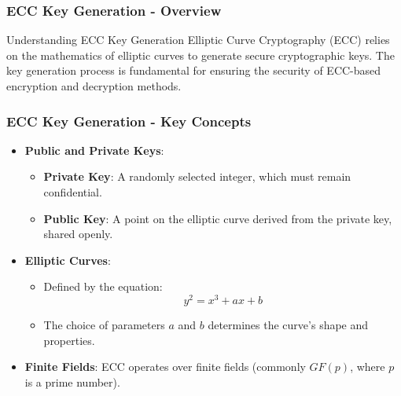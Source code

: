 \documentclass{beamer}
\begin{document}
\begin{frame}[fragile]
    \frametitle{ECC Key Generation - Overview}
    \begin{block}{Understanding ECC Key Generation}
        Elliptic Curve Cryptography (ECC) relies on the mathematics of elliptic curves to generate secure cryptographic keys. The key generation process is fundamental for ensuring the security of ECC-based encryption and decryption methods.
    \end{block}
\end{frame}

\begin{frame}[fragile]
    \frametitle{ECC Key Generation - Key Concepts}
    \begin{itemize}
        \item \textbf{Public and Private Keys}:
        \begin{itemize}
            \item \textbf{Private Key}: A randomly selected integer, which must remain confidential.
            \item \textbf{Public Key}: A point on the elliptic curve derived from the private key, shared openly.
        \end{itemize}
        
        \item \textbf{Elliptic Curves}:
        \begin{itemize}
            \item Defined by the equation:
            \begin{equation}
                y^2 = x^3 + ax + b
            \end{equation}
            \item The choice of parameters \(a\) and \(b\) determines the curve's shape and properties.
        \end{itemize}
        
        \item \textbf{Finite Fields}: ECC operates over finite fields (commonly \(GF(p)\), where \(p\) is a prime number).
    \end{itemize}
\end{frame}
\end{document}
